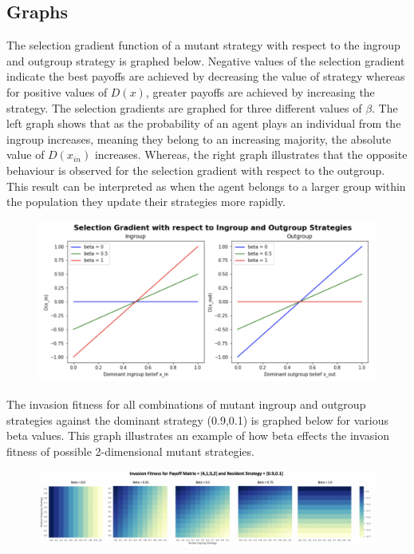 \documentclass[]{llncs}
\begin{document}
\subsection{Graphs}
The selection gradient function of a mutant strategy with respect to the ingroup and outgroup strategy is graphed below. Negative values of the selection gradient indicate the best payoffs are achieved by decreasing the value of strategy whereas for positive values of $D(x)$, greater payoffs are achieved by increasing the strategy. The selection gradients are graphed for three different values of $\beta$. The left graph shows that as the probability of an agent plays an individual from the ingroup increases, meaning they belong to an increasing majority, the absolute value of $D(x_{in})$ increases. Whereas, the right graph illustrates that the opposite behaviour is observed for the selection gradient with respect to the outgroup. This result can be interpreted as when the agent belongs to a larger group within the population they update their strategies more rapidly. 

\begin{figure}
\centering
\includegraphics[width=12cm]{images/beta_sg}
\end{figure}

The invasion fitness for all combinations of mutant ingroup and outgroup strategies against the dominant strategy (0.9,0.1) is graphed below for various beta values. This graph illustrates an example of how beta effects the invasion fitness of possible 2-dimensional mutant strategies.

\begin{figure}
\centering
\includegraphics[width=15cm]{images/inv_fit_beta}
\end{figure}
\end{document}
